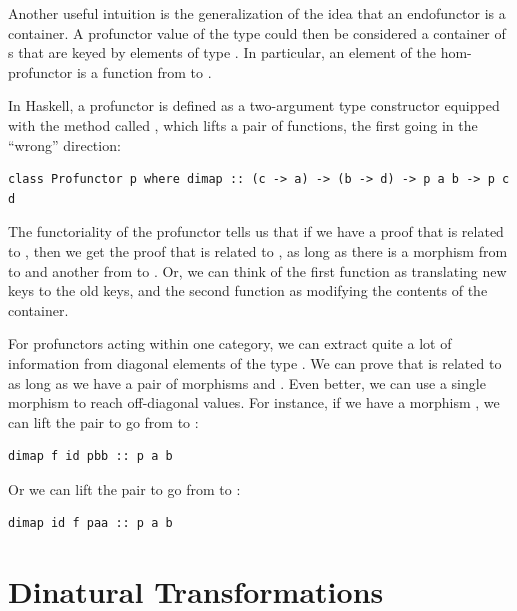 Another useful intuition is the generalization of the idea that an
endofunctor is a container. A profunctor value of the type
 could then be considered a container of s
that are keyed by elements of type . In particular, an element
of the hom-profunctor is a function from  to .

In Haskell, a profunctor is defined as a two-argument type constructor
 equipped with the method called , which lifts a
pair of functions, the first going in the ``wrong'' direction:

\begin{verbatim}
class Profunctor p where dimap :: (c -> a) -> (b -> d) -> p a b -> p c d
\end{verbatim}

The functoriality of the profunctor tells us that if we have a proof
that  is related to , then we get the proof that
 is related to , as long as there is a morphism from
 to  and another from  to . Or,
we can think of the first function as translating new keys to the old
keys, and the second function as modifying the contents of the
container.

For profunctors acting within one category, we can extract quite a lot
of information from diagonal elements of the type . We
can prove that  is related to  as long as we have a
pair of morphisms  and
. Even better, we can use a single morphism to
reach off-diagonal values. For instance, if we have a morphism
, we can lift the pair
 to go from  to
:

\begin{verbatim}
dimap f id pbb :: p a b
\end{verbatim}

Or we can lift the pair  to go
from  to :

\begin{verbatim}
dimap id f paa :: p a b
\end{verbatim}

\section{Dinatural Transformations}\label{dinatural-transformations}

